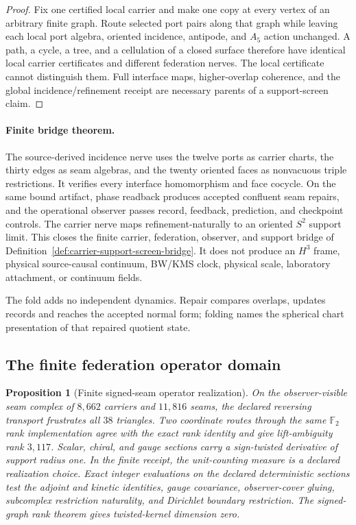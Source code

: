 \documentclass[11pt]{article}
\newtheorem{proposition}[theorem]{Proposition}
\theoremstyle{remark}
\theoremstyle{plain}
\begin{document}
\begin{proof}
Fix one certified local carrier and make one copy at every vertex of an arbitrary finite graph.
Route selected port pairs along that graph while leaving each local port algebra, oriented
incidence, antipode, and \(A_5\) action unchanged. A path, a cycle, a tree, and a cellulation of a
closed surface therefore have identical local carrier certificates and different federation
nerves. The local certificate cannot distinguish them. Full interface maps, higher-overlap
coherence, and the global incidence/refinement receipt are necessary parents of a support-screen
claim.
\end{proof}

\paragraph{Finite bridge theorem.}
The source-derived incidence nerve uses the twelve ports as carrier charts,
the thirty edges as seam algebras, and the twenty oriented faces as
nonvacuous triple restrictions. It verifies every interface homomorphism and
face cocycle. On the same bound artifact, phase readback produces accepted
confluent seam repairs, and the operational observer passes record, feedback,
prediction, and checkpoint controls. The carrier nerve maps
refinement-naturally to an oriented \(S^2\) support limit. This closes the
finite carrier, federation, observer, and support bridge of
Definition~\ref{def:carrier-support-screen-bridge}. It does not produce an
\(H^3\) frame, physical source-causal continuum, BW/KMS clock, physical scale, laboratory
attachment, or continuum fields.



The fold adds no independent dynamics. Repair compares overlaps, updates
records and reaches the accepted normal form; folding names the spherical
chart presentation of that repaired quotient state.

\subsection{The finite federation operator domain}
\label{sec:finite-local-action-domain}

\begin{proposition}[Finite signed-seam operator realization]
\label{prop:finite-source-inhabitation}
On the observer-visible seam complex of \(8{,}662\) carriers and \(11{,}816\)
seams, the declared reversing transport frustrates all \(38\) triangles. Two
coordinate routes through the same \(\mathbb F_2\) rank implementation agree
with the exact rank identity and give lift-ambiguity rank \(3{,}117\).
Scalar, chiral, and gauge sections carry a sign-twisted
derivative of support radius one. In the finite receipt, the unit-counting
measure is a declared realization choice.
Exact integer evaluations on the declared deterministic sections test the
adjoint and kinetic identities, gauge covariance, observer-cover gluing,
subcomplex restriction naturality, and Dirichlet boundary restriction. The
signed-graph rank theorem gives twisted-kernel dimension zero.

\end{proposition}
\end{document}

